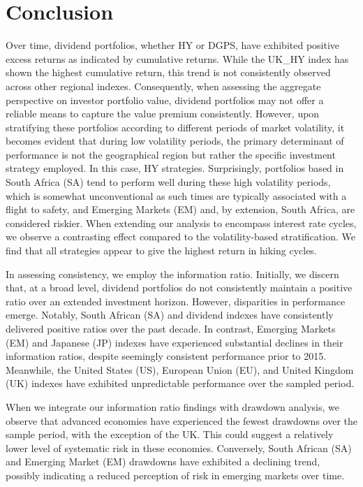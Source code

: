 \documentclass[12pt,preprint, authoryear]{elsarticle}
\numberwithin{equation}{section}
\numberwithin{figure}{section}
\numberwithin{table}{section}
\begin{document}
\hypertarget{conclusion}{%
\section{Conclusion}\label{conclusion}}

Over time, dividend portfolios, whether HY or DGPS, have exhibited
positive excess returns as indicated by cumulative returns. While the
UK\_HY index has shown the highest cumulative return, this trend is not
consistently observed across other regional indexes. Consequently, when
assessing the aggregate perspective on investor portfolio value,
dividend portfolios may not offer a reliable means to capture the value
premium consistently. However, upon stratifying these portfolios
according to different periods of market volatility, it becomes evident
that during low volatility periods, the primary determinant of
performance is not the geographical region but rather the specific
investment strategy employed. In this case, HY strategies. Surprisingly,
portfolios based in South Africa (SA) tend to perform well during these
high volatility periods, which is somewhat unconventional as such times
are typically associated with a flight to safety, and Emerging Markets
(EM) and, by extension, South Africa, are considered riskier. When
extending our analysis to encompass interest rate cycles, we observe a
contrasting effect compared to the volatility-based stratification. We
find that all strategies appear to give the highest return in hiking
cycles.

In assessing consistency, we employ the information ratio. Initially, we
discern that, at a broad level, dividend portfolios do not consistently
maintain a positive ratio over an extended investment horizon. However,
disparities in performance emerge. Notably, South African (SA) and
dividend indexes have consistently delivered positive ratios over the
past decade. In contrast, Emerging Markets (EM) and Japanese (JP)
indexes have experienced substantial declines in their information
ratios, despite seemingly consistent performance prior to 2015.
Meanwhile, the United States (US), European Union (EU), and United
Kingdom (UK) indexes have exhibited unpredictable performance over the
sampled period.

When we integrate our information ratio findings with drawdown analysis,
we observe that advanced economies have experienced the fewest drawdowns
over the sample period, with the exception of the UK. This could suggest
a relatively lower level of systematic risk in these economies.
Conversely, South African (SA) and Emerging Market (EM) drawdowns have
exhibited a declining trend, possibly indicating a reduced perception of
risk in emerging markets over time.
\end{document}
